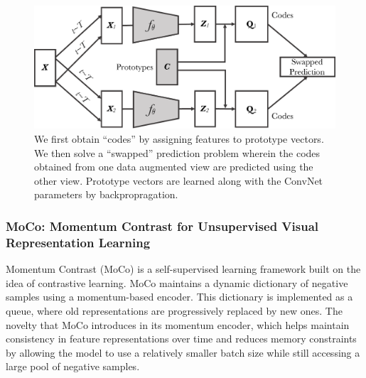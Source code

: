 \begin{figure}[t]
\includegraphics[height=.4\linewidth]{images/oto_simple.pdf}
\caption{
We first obtain ``codes'' by assigning features to prototype vectors.
We then solve a ``swapped'' prediction problem wherein the codes obtained from one data augmented view are predicted using the other view.
Prototype vectors are learned along with the ConvNet parameters by backpropragation. 
}
\end{figure}

\subsubsection{MoCo: Momentum Contrast for Unsupervised Visual Representation Learning}
Momentum Contrast (MoCo) \cite{he2020momentum} is a self-supervised learning framework built on the idea of contrastive learning. MoCo maintains a dynamic dictionary of negative samples using a momentum-based encoder. This dictionary is implemented as a queue, where old representations are progressively replaced by new ones. The novelty that MoCo introduces in its momentum encoder, which helps maintain consistency in feature representations over time and reduces memory constraints by allowing the model to use a relatively smaller batch size while still accessing a large pool of negative samples.


